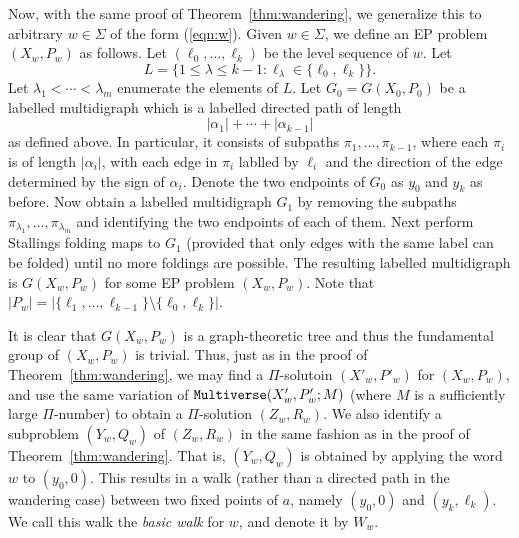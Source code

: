 \documentclass[10pt,a4paper]{amsart}
\theoremstyle{definition}
\theoremstyle{definition}
\numberwithin{equation}{section}
\begin{document}
Now, with the same proof of Theorem~\ref{thm:wandering}, we generalize this to arbitrary $w\in \Sigma$ of the form (\ref{eqn:w}). Given $w\in\Sigma$, we define an EP problem $(X_w, P_w)$ as follows. Let $(\ell_0, \dots, \ell_k)$ be the level sequence of $w$. Let
$$ L=\big\{1\leq \lambda\leq k-1\colon \ell_\lambda\in \{\ell_0, \ell_k\}\big\}. $$
Let $\lambda_1<\cdots<\lambda_m$ enumerate the elements of $L$. Let $G_0=G(X_0, P_0)$ be a labelled multidigraph which is a labelled directed path of length
$$ |\alpha_1|+\cdots+|\alpha_{k-1}|$$
as defined above. In particular, it consists of subpaths $\pi_1,\dots, \pi_{k-1}$, where each $\pi_i$ is of length $|\alpha_i|$, with each edge in $\pi_i$ lablled by $\ell_i$ and the direction of the edge determined by the sign of $\alpha_i$. Denote the two endpoints of $G_0$ as $y_0$ and $y_k$ as before. Now obtain a labelled multidigraph $G_1$ by removing the subpaths $\pi_{\lambda_1}, \dots, \pi_{\lambda_m}$ and identifying the two endpoints of each of them. Next perform Stallings folding maps to $G_1$ (provided that only edges with the same label can be folded) until no more foldings are possible. The resulting labelled multidigraph is $G(X_w, P_w)$ for some EP problem $(X_w, P_w)$. Note that $|P_w|=|\{\ell_1,\dots, \ell_{k-1}\}\setminus\{\ell_0, \ell_k\}|$.

It is clear that $G(X_w, P_w)$ is a graph-theoretic tree and thus the fundamental group of $(X_w, P_w)$ is trivial. Thus, just as in the proof of Theorem~\ref{thm:wandering}, we may find a $\Pi$-solutoin $(X'_w, P'_w)$ for $(X_w, P_w)$, and use the same variation of ${\tt Multiverse}(X'_w, P'_w; M)$ (where $M$ is a sufficiently large $\Pi$-number) to obtain a $\Pi$-solution $(Z_w, R_w)$. We also identify a subproblem $(Y_w, Q_w)$ of $(Z_w, R_w)$ in the same fashion as in the proof of Theorem~\ref{thm:wandering}. That is, $(Y_w, Q_w)$ is obtained by applying the word $w$ to $(y_0,0)$. This results in a walk (rather than a directed path in the wandering case) between two fixed points of $a$, namely $(y_0,0)$ and $(y_k,\ell_k)$.
We call this walk the {\em basic walk} for $w$, and denote it by $W_w$. 
\end{document}

